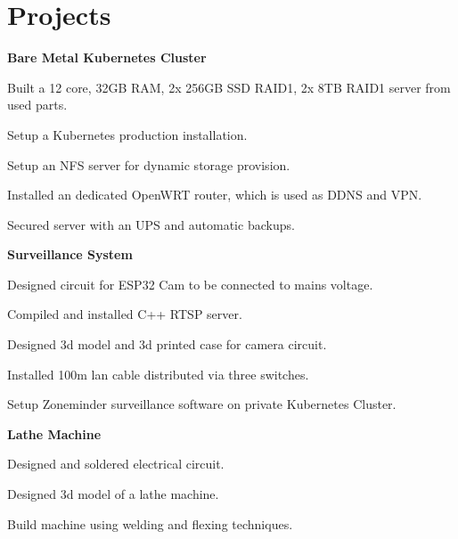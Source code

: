 \documentclass[11pt]{article}
\begin{document}
\section*{Projects}

\newcommand{\project}[2]{
  \textbf{#1}
  \begin{compactitem}#2\end{compactitem}
}

\project{Bare Metal Kubernetes Cluster}{
  \item Built a 12 core, 32GB RAM, 2x 256GB SSD RAID1, 2x 8TB RAID1 server from used parts.
  \item Setup a Kubernetes production installation.
  \item Setup an NFS server for dynamic storage provision.
  \item Installed an dedicated OpenWRT router, which is used as DDNS and VPN.
  \item Secured server with an UPS and automatic backups.
}

\project{Surveillance System}{
  \item Designed circuit for ESP32 Cam to be connected to mains voltage.
  \item Compiled and installed C++ RTSP server.
  \item Designed 3d model and 3d printed case for camera circuit.
  \item Installed 100m lan cable distributed via three switches.
  \item Setup Zoneminder surveillance software on private Kubernetes Cluster.
}

\project{Lathe Machine}{
  \item Designed and soldered electrical circuit.
  \item Designed 3d model of a lathe machine.
  \item Build machine using welding and flexing techniques.
}
\end{document}

